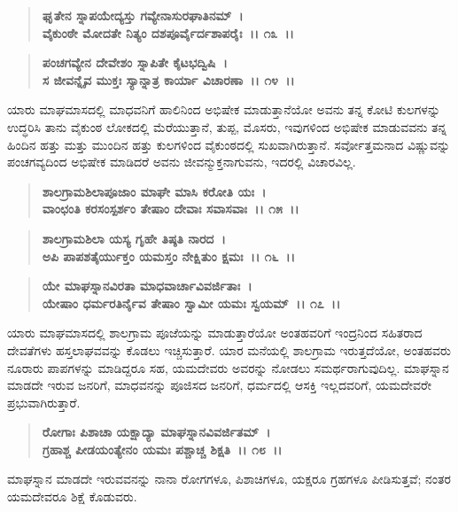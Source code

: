 \begin{verse}
\textbf{ಘೃತೇನ ಸ್ನಾಪಯೇದ್ಯಸ್ತು ಗವ್ಯೇನಾಸುರಘಾತಿನಮ್~।}\\\textbf{ವೈಕುಂಠೇ ಮೋದತೇ ನಿತ್ಯಂ ದಶಪೂರ್ವೈರ್ದಶಾಪರೈಃ~।। ೧೩~।।}
\end{verse}

\begin{verse}
\textbf{ಪಂಚಗವ್ಯೇನ ದೇವೇಶಂ ಸ್ನಾಪಿತೇ ಕೈಟಭದ್ವಿಷಿ~।}\\\textbf{ಸ ಜೀವನ್ನೈವ ಮುಕ್ತಃ ಸ್ಯಾನ್ನಾತ್ರ ಕಾರ್ಯಾ ವಿಚಾರಣಾ~।। ೧೪~।।}
\end{verse}

ಯಾರು ಮಾಘಮಾಸದಲ್ಲಿ ಮಾಧವನಿಗೆ ಹಾಲಿನಿಂದ ಅಭಿಷೇಕ ಮಾಡುತ್ತಾನೆಯೋ ಅವನು ತನ್ನ ಕೋಟಿ ಕುಲಗಳನ್ನು ಉದ್ಧರಿಸಿ ತಾನು ವೈಕುಂಠ ಲೋಕದಲ್ಲಿ ಮೆರೆಯುತ್ತಾನೆ, ತುಪ್ಪ, ಮೊಸರು, ಇವುಗಳಿಂದ ಅಭಿಷೇಕ ಮಾಡುವವನು ತನ್ನ ಹಿಂದಿನ ಹತ್ತು ಮತ್ತು ಮುಂದಿನ ಹತ್ತು ಕುಲಗಳಿಂದ ವೈಕುಂಠದಲ್ಲಿ ಸುಖವಾಗಿರುತ್ತಾನೆ. ಸರ್ವೋತ್ತಮನಾದ ವಿಷ್ಣುವನ್ನು ಪಂಚಗವ್ಯದಿಂದ ಅಭಿಷೇಕ ಮಾಡಿದರೆ ಅವನು ಜೀವನ್ಮುಕ್ತನಾಗುವನು, ಇದರಲ್ಲಿ ವಿಚಾರವಿಲ್ಲ.

\begin{verse}
\textbf{ಶಾಲಗ್ರಾಮಶಿಲಾಪೂಜಾಂ ಮಾಘೇ ಮಾಸಿ ಕರೋತಿ ಯಃ~।}\\\textbf{ವಾಂಛಂತಿ ಕರಸಂಸ್ಪರ್ಶಂ ತೇಷಾಂ ದೇವಾಃ ಸವಾಸವಾಃ~।। ೧೫~।। }
\end{verse}

\begin{verse}
\textbf{ಶಾಲಗ್ರಾಮಶಿಲಾ ಯಸ್ಯ ಗೃಹೇ ತಿಷ್ಠತಿ ನಾರದ~।}\\\textbf{ಅಪಿ ಪಾಪಶತೈರ್ಯುಕ್ತಂ ಯಮಸ್ತಂ ನೇಕ್ಷಿತುಂ ಕ್ಷಮಃ~।। ೧೬~।।} 
\end{verse}

\begin{verse}
\textbf{ಯೇ ಮಾಘಸ್ನಾನವಿರತಾ ಮಾಧವಾರ್ಚಾವಿವರ್ಜಿತಾಃ~।}\\\textbf{ಯೇಷಾಂ ಧರ್ಮರತಿರ್ನೈವ ತೇಷಾಂ ಸ್ವಾಮೀ ಯಮಃ ಸ್ವಯಮ್~।। ೧೭~।।}
\end{verse}

ಯಾರು ಮಾಘಮಾಸದಲ್ಲಿ ಶಾಲಗ್ರಾಮ ಪೂಜೆಯನ್ನು ಮಾಡುತ್ತಾರೆಯೋ ಅಂತಹವರಿಗೆ ಇಂದ್ರನಿಂದ ಸಹಿತರಾದ ದೇವತೆಗಳು ಹಸ್ತಲಾಘವವನ್ನು ಕೊಡಲು ಇಚ್ಚಿಸುತ್ತಾರೆ. ಯಾರ ಮನೆಯಲ್ಲಿ ಶಾಲಗ್ರಾಮ ಇರುತ್ತದೆಯೋ, ಅಂತಹವರು ನೂರಾರು ಪಾಪಗಳನ್ನು ಮಾಡಿದ್ದರೂ ಸಹ, ಯಮದೇವರು ಅವರನ್ನು ನೋಡಲು ಸಮರ್ಥರಾಗುವುದಿಲ್ಲ. ಮಾಘ\-ಸ್ನಾನ ಮಾಡದೇ ಇರುವ ಜನರಿಗೆ, ಮಾಧವನನ್ನು ಪೂಜಿಸದ ಜನರಿಗೆ, ಧರ್ಮದಲ್ಲಿ ಆಸಕ್ತಿ ಇಲ್ಲದವರಿಗೆ, ಯಮದೇವರೇ ಪ್ರಭುವಾಗಿರುತ್ತಾರೆ.

\begin{verse}
\textbf{ರೋಗಾಃ ಪಿಶಾಚಾ ಯಕ್ಷಾದ್ಯಾ ಮಾಘಸ್ನಾನವಿವರ್ಜಿತಮ್~।}\\\textbf{ಗ್ರಹಾಶ್ಚ ಪೀಡಯಂತ್ಯೇನಂ ಯಮಃ ಪಶ್ಚಾಚ್ಚ ಶಿಕ್ಷತಿ~।। ೧೮~।।}
\end{verse}

ಮಾಘಸ್ನಾನ ಮಾಡದೇ ಇರುವವನನ್ನು ನಾನಾ ರೋಗಗಳೂ, ಪಿಶಾಚಿಗಳೂ, ಯಕ್ಷರೂ ಗ್ರಹಗಳೂ ಪೀಡಿಸುತ್ತವೆ; ನಂತರ ಯಮದೇವರೂ ಶಿಕ್ಷೆ ಕೊಡುವರು.

